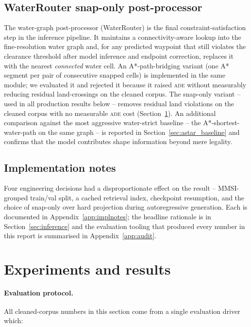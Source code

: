 \documentclass[oneside, a4paper, onecolumn, 11pt]{article}
\newcommand{\ade}{\textsc{ade}}
\begin{document}
\subsection{WaterRouter snap-only post-processor}

The water-graph post-processor (WaterRouter) is the final
constraint-satisfaction step in the inference pipeline.  It maintains
a connectivity-aware lookup into the fine-resolution water graph and,
for any predicted waypoint that still violates the clearance
threshold after model inference and endpoint correction, replaces it
with the nearest \emph{connected} water cell.  An A*-path-bridging
variant (one A* segment per pair of consecutive snapped cells) is
implemented in the same module; we evaluated it and rejected it
because it raised \ade{} without measurably reducing residual
land-crossings on the cleaned corpus.  The snap-only variant -- used
in all production results below -- removes residual land violations
on the cleaned corpus with no measurable \ade{} cost
(Section~\ref{sec:experiments}).  An additional comparison against
the most aggressive water-strict baseline -- the A*-shortest-water-path
on the same graph -- is reported in Section~\ref{sec:astar_baseline}
and confirms that the model contributes shape information beyond mere
legality.

\subsection{Implementation notes}

Four engineering decisions had a disproportionate effect on the
result -- MMSI-grouped train/val split, a cached retrieval index,
checkpoint resumption, and the choice of snap-only over hard
projection during autoregressive generation.  Each is documented in
Appendix~\ref{app:implnotes}; the headline rationale is in
Section~\ref{sec:inference} and the evaluation tooling that produced
every number in this report is summarised in Appendix~\ref{app:audit}.

\section{Experiments and results}\label{sec:experiments}

\paragraph{Evaluation protocol.}
All cleaned-corpus numbers in this section come from a single
evaluation driver which:
\end{document}
